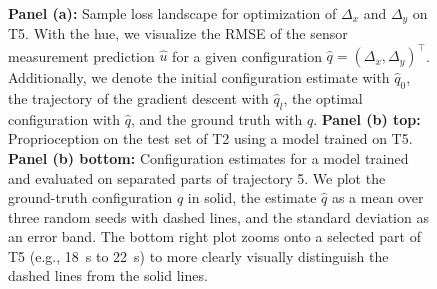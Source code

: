 \begin{figure}[hbt]
  \centering
  \\ %
  
  \caption{\textbf{Panel (a):} Sample loss landscape for optimization of $\Delta_x$ and $\Delta_y$ on T5. With the hue, we visualize the RMSE of the sensor measurement prediction $\hat{u}$ for a given configuration $\hat{q} = (\Delta_x, \Delta_y)^\top$. Additionally, we denote the initial configuration estimate with $\hat{q}_0$, the trajectory of the gradient descent with $\hat{q}_l$, the optimal configuration with $\hat{q}$, and the ground truth with $q$. \textbf{Panel (b) top:} Proprioception on the test set of T2 using a model trained on T5. \textbf{Panel (b) bottom:} Configuration estimates for a model trained and evaluated on separated parts of trajectory 5. We plot the ground-truth configuration $q$ in solid, the estimate $\hat{q}$ as a mean over three random seeds with dashed lines, and the standard deviation as an error band. The bottom right plot zooms onto a selected part of T5 (e.g., \SI{18}{s} to \SI{22}{s}) to more clearly visually distinguish the dashed lines from the solid lines.}
  \label{fig:promasens:results_trajectories}
\end{figure}

